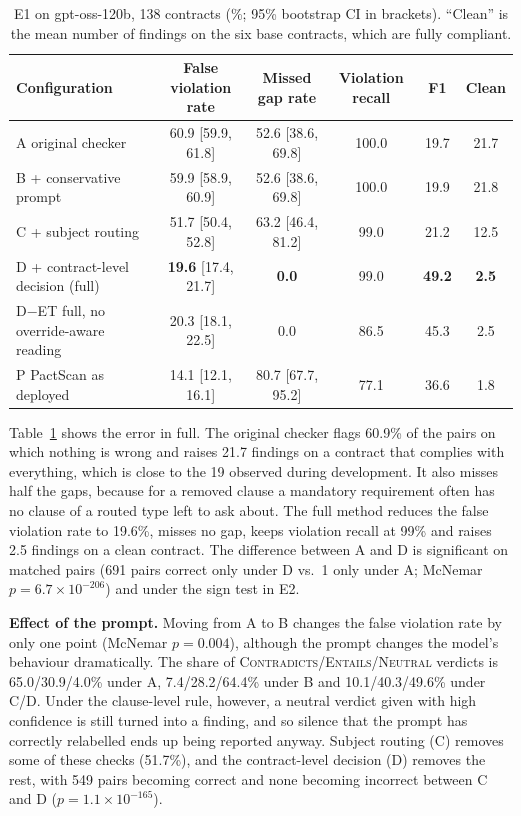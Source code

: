 \documentclass[conference]{IEEEtran}
\begin{document}
\begin{table}[t]
\centering
\caption{E1 on gpt-oss-120b, 138 contracts (\%; 95\% bootstrap CI in brackets). ``Clean'' is the mean number of findings on the six base contracts, which are fully compliant.}
\label{tab:e1}
\begin{tabular}{lccccc}
\toprule
Configuration & False violation rate & Missed gap rate & Violation recall & F1 & Clean \\
\midrule
A\; original checker & 60.9 [59.9, 61.8] & 52.6 [38.6, 69.8] & 100.0 & 19.7 & 21.7 \\
B\; + conservative prompt & 59.9 [58.9, 60.9] & 52.6 [38.6, 69.8] & 100.0 & 19.9 & 21.8 \\
C\; + subject routing & 51.7 [50.4, 52.8] & 63.2 [46.4, 81.2] & 99.0 & 21.2 & 12.5 \\
D\; + contract-level decision (full) & \textbf{19.6} [17.4, 21.7] & \textbf{0.0} & 99.0 & \textbf{49.2} & \textbf{2.5} \\
D$-$ET\; full, no override-aware reading & 20.3 [18.1, 22.5] & 0.0 & 86.5 & 45.3 & 2.5 \\
P\; PactScan as deployed & 14.1 [12.1, 16.1] & 80.7 [67.7, 95.2] & 77.1 & 36.6 & 1.8 \\
\bottomrule
\end{tabular}
\end{table}

Table~\ref{tab:e1} shows the error in full. The original checker flags 60.9\% of the pairs on which nothing is wrong and raises 21.7 findings on a contract that complies with everything, which is close to the 19 observed during development. It also misses half the gaps, because for a removed clause a mandatory requirement often has no clause of a routed type left to ask about. The full method reduces the false violation rate to 19.6\%, misses no gap, keeps violation recall at 99\% and raises 2.5 findings on a clean contract. The difference between A and D is significant on matched pairs (691 pairs correct only under D vs.\ 1 only under A; McNemar $p=6.7\times10^{-206}$) and under the sign test in E2.

\textbf{Effect of the prompt.} Moving from A to B changes the false violation rate by only one point (McNemar $p=0.004$), although the prompt changes the model's behaviour dramatically. The share of \textsc{Contradicts}/\textsc{Entails}/\textsc{Neutral} verdicts is 65.0/30.9/4.0\% under A, 7.4/28.2/64.4\% under B and 10.1/40.3/49.6\% under C/D. Under the clause-level rule, however, a neutral verdict given with high confidence is still turned into a finding, and so silence that the prompt has correctly relabelled ends up being reported anyway. Subject routing (C) removes some of these checks (51.7\%), and the contract-level decision (D) removes the rest, with 549 pairs becoming correct and none becoming incorrect between C and D ($p=1.1\times10^{-165}$).
\end{document}
